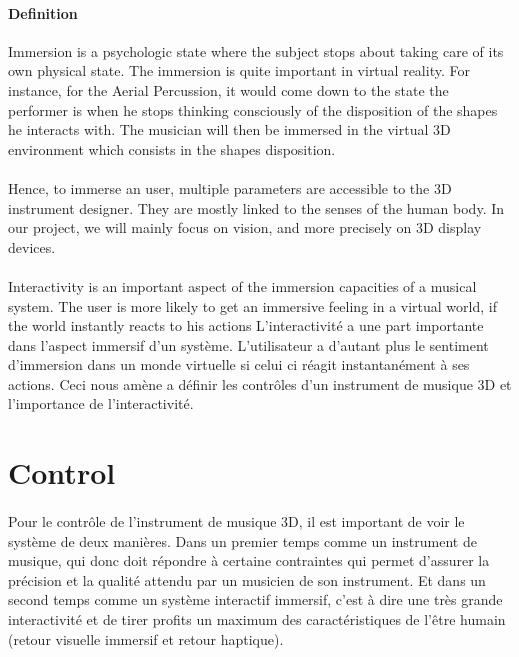\paragraph{Definition}
Immersion is a psychologic state where the subject stops about taking care of its own physical state.
The immersion is quite important in virtual reality. For instance, for the Aerial Percussion, it would come down to the state the performer is when he stops thinking consciously of the disposition of the shapes he interacts with. The musician will then be immersed in the virtual 3D environment which consists in the shapes disposition.

\paragraph{}
Hence, to immerse an user, multiple parameters are accessible to the 3D instrument designer. 
They are mostly linked to the senses of the human body. In our project, we will mainly focus on vision, and more precisely on 3D display devices.

\paragraph{}
Interactivity is an important aspect of the immersion capacities of a musical system.
The user is more likely to get an immersive feeling in a virtual world, if the world instantly reacts to his actions
L'interactivité a une part importante dans l'aspect immersif d'un système. L'utilisateur a d'autant plus le sentiment d'immersion dans un monde virtuelle si celui ci réagit instantanément à ses actions. Ceci nous amène a définir les contrôles d'un instrument de musique 3D et l'importance de l'interactivité.

\section{Control}
\paragraph{}
Pour le contrôle de l'instrument de musique 3D, il est important de voir le système de deux manières. Dans un premier temps comme un instrument de musique, qui donc doit répondre à certaine contraintes qui permet d'assurer la précision et la qualité attendu par un musicien de son instrument. Et dans un second temps comme un système interactif immersif, c'est à dire une très grande interactivité et de tirer profits un maximum des caractéristiques de l'être humain (retour visuelle immersif et retour haptique).

